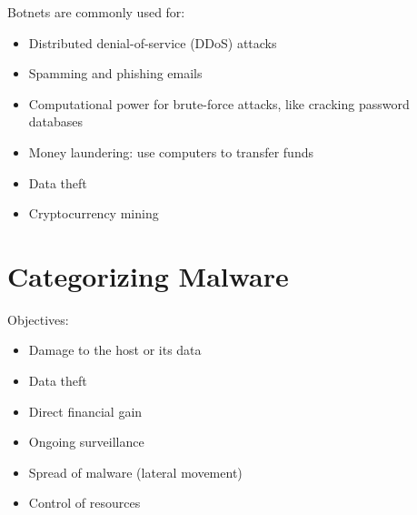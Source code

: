 \documentclass[code]{amznotes}
\begin{document}
Botnets are commonly used for:
\begin{itemize}
    \item Distributed denial-of-service (DDoS) attacks
    \item Spamming and phishing emails
    \item Computational power for brute-force attacks, like cracking password databases
    \item Money laundering: use computers to transfer funds
    \item Data theft
    \item Cryptocurrency mining
\end{itemize}

\section{Categorizing Malware}
Objectives:
\begin{itemize}
    \item Damage to the host or its data
    \item Data theft
    \item Direct financial gain
    \item Ongoing surveillance
    \item Spread of malware (lateral movement)
    \item Control of resources
\end{itemize}

\amzindex
\end{document}
